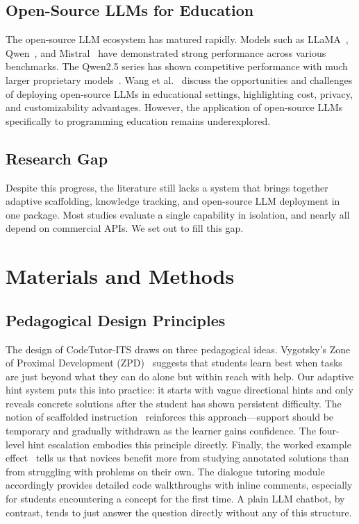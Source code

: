 \documentclass[applsci,article,submit,pdftex,moreauthors]{Definitions/mdpi}
\begin{document}
\subsection{Open-Source LLMs for Education}

The open-source LLM ecosystem has matured rapidly. Models such as LLaMA~\cite{ref8}, Qwen~\cite{ref24}, and Mistral~\cite{ref25} have demonstrated strong performance across various benchmarks. The Qwen2.5 series has shown competitive performance with much larger proprietary models~\cite{ref24}. Wang et al.~\cite{ref26} discuss the opportunities and challenges of deploying open-source LLMs in educational settings, highlighting cost, privacy, and customizability advantages. However, the application of open-source LLMs specifically to programming education remains underexplored.

\subsection{Research Gap}

Despite this progress, the literature still lacks a system that brings together adaptive scaffolding, knowledge tracking, and open-source LLM deployment in one package. Most studies evaluate a single capability in isolation, and nearly all depend on commercial APIs. We set out to fill this gap.

\section{Materials and Methods}

\subsection{Pedagogical Design Principles}

The design of CodeTutor-ITS draws on three pedagogical ideas. Vygotsky's Zone of Proximal Development (ZPD)~\cite{ref27} suggests that students learn best when tasks are just beyond what they can do alone but within reach with help. Our adaptive hint system puts this into practice: it starts with vague directional hints and only reveals concrete solutions after the student has shown persistent difficulty. The notion of scaffolded instruction~\cite{ref28} reinforces this approach---support should be temporary and gradually withdrawn as the learner gains confidence. The four-level hint escalation embodies this principle directly. Finally, the worked example effect~\cite{ref29} tells us that novices benefit more from studying annotated solutions than from struggling with problems on their own. The dialogue tutoring module accordingly provides detailed code walkthroughs with inline comments, especially for students encountering a concept for the first time. A plain LLM chatbot, by contrast, tends to just answer the question directly without any of this structure.
\end{document}
